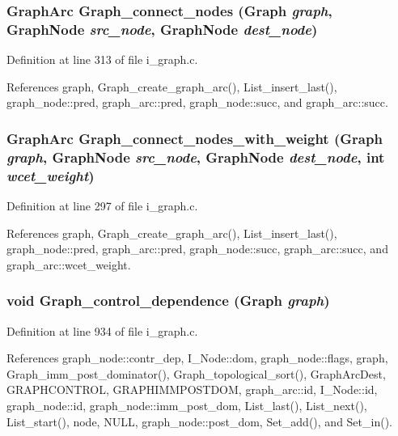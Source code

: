 \subsubsection{\setlength{\rightskip}{0pt plus 5cm}\bf{Graph\-Arc} Graph\_\-connect\_\-nodes (\bf{Graph} {\em graph}, \bf{Graph\-Node} {\em src\_\-node}, \bf{Graph\-Node} {\em dest\_\-node})}\label{i__graph_8h_3850703f4565c65fa3b4fc1d80f76b69}




Definition at line 313 of file i\_\-graph.c.

References graph, Graph\_\-create\_\-graph\_\-arc(), List\_\-insert\_\-last(), graph\_\-node::pred, graph\_\-arc::pred, graph\_\-node::succ, and graph\_\-arc::succ.
\subsubsection{\setlength{\rightskip}{0pt plus 5cm}\bf{Graph\-Arc} Graph\_\-connect\_\-nodes\_\-with\_\-weight (\bf{Graph} {\em graph}, \bf{Graph\-Node} {\em src\_\-node}, \bf{Graph\-Node} {\em dest\_\-node}, int {\em wcet\_\-weight})}\label{i__graph_8h_17c05e9d6088587f89bed7df00e64d85}




Definition at line 297 of file i\_\-graph.c.

References graph, Graph\_\-create\_\-graph\_\-arc(), List\_\-insert\_\-last(), graph\_\-node::pred, graph\_\-arc::pred, graph\_\-node::succ, graph\_\-arc::succ, and graph\_\-arc::wcet\_\-weight.
\subsubsection{\setlength{\rightskip}{0pt plus 5cm}void Graph\_\-control\_\-dependence (\bf{Graph} {\em graph})}\label{i__graph_8h_da63051f5b0a209dae89861afba3a5f8}




Definition at line 934 of file i\_\-graph.c.

References graph\_\-node::contr\_\-dep, I\_\-Node::dom, graph\_\-node::flags, graph, Graph\_\-imm\_\-post\_\-dominator(), Graph\_\-topological\_\-sort(), Graph\-Arc\-Dest, GRAPHCONTROL, GRAPHIMMPOSTDOM, graph\_\-arc::id, I\_\-Node::id, graph\_\-node::id, graph\_\-node::imm\_\-post\_\-dom, List\_\-last(), List\_\-next(), List\_\-start(), node, NULL, graph\_\-node::post\_\-dom, Set\_\-add(), and Set\_\-in().

